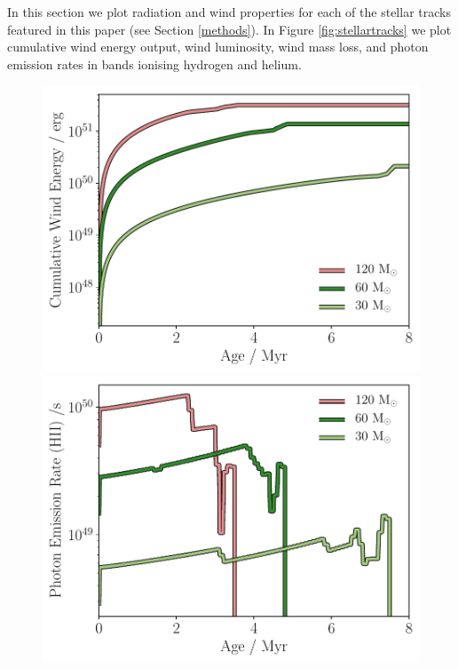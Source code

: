 \documentclass[a4paper,fleqn,usenatbib]{mnras}
\begin{document}
In this section we plot radiation and wind properties for each of the stellar tracks featured in this paper (see Section \ref{methods}). In Figure \ref{fig:stellartracks} we plot cumulative wind energy output, wind luminosity, wind mass loss, and photon emission rates in bands ionising hydrogen and helium.

\begin{figure}
	\includegraphics[width=1\columnwidth]{../plots/stellarevolution_windenergy.pdf} 
	\includegraphics[width=1\columnwidth]{../plots/stellarevolution_photoHII.pdf}

\end{figure}
\end{document}
